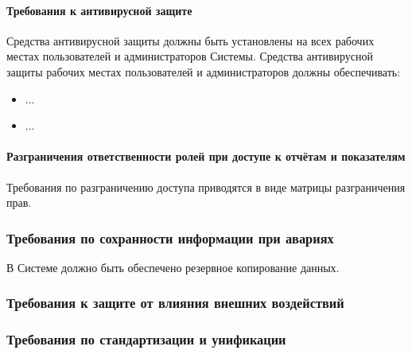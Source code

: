 \documentclass[a4paper, 12pt]{article}		%
\begin{document}
\paragraph{Требования к антивирусной защите\\}

Средства антивирусной защиты должны быть установлены на всех рабочих местах пользователей и администраторов Системы. Средства антивирусной защиты рабочих местах пользователей и администраторов должны обеспечивать:
\begin{itemize}
\item ...
\item ...
\end{itemize}

\paragraph{Разграничения ответственности ролей при доступе к отчётам и показателям\\}

Требования по разграничению доступа приводятся в виде матрицы разграничения прав.

\subsubsection{Требования по сохранности информации при авариях}


В Системе должно быть обеспечено резервное копирование данных.

\subsubsection{Требования к защите от влияния внешних воздействий}


\subsubsection{Требования по стандартизации и унификации}

\end{document}
